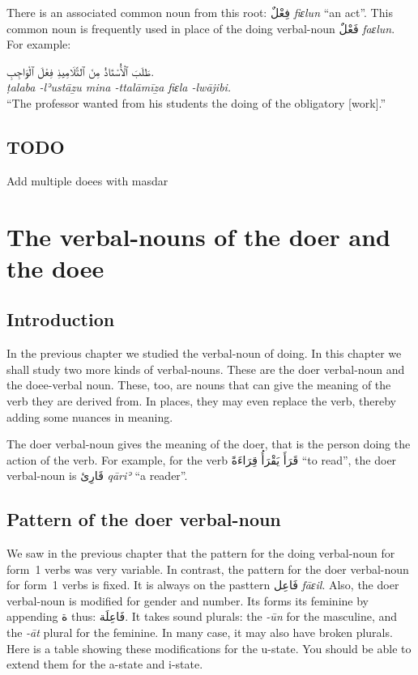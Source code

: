 \documentclass[
  10pt,
]{book}
\begin{document}
There is an associated common noun from this root: \foreignlanguage{arabic}{فِعْلٌ} \emph{fiɛlun} \enquote{an act}. This common noun is frequently used in place of the doing verbal-noun \foreignlanguage{arabic}{فَعْلٌ} \emph{faɛlun}. For example:

\foreignlanguage{arabic}{طَلَبَ ٱلْأُسْتَاذُ مِنَ ٱلتَّلَامِيذِ فِعْلَ ٱلْوَاجِبِ.}\\
\emph{ṭalaba -lʾustāẕu mina -ttalāmīẕa fiɛla -lwājibi.}\\
\enquote{The professor wanted from his students the doing of the obligatory {[}work{]}.}

\section{TODO}\label{todo-1}

Add multiple doees with masdar

\chapter{The verbal-nouns of the doer and the doee}\label{the-verbal-nouns-of-the-doer-and-the-doee}

\section{Introduction}\label{introduction-17}

In the previous chapter we studied the verbal-noun of doing. In this chapter we shall study two more kinds of verbal-nouns. These are the doer verbal-noun and the doee-verbal noun. These, too, are nouns that can give the meaning of the verb they are derived from. In places, they may even replace the verb, thereby adding some nuances in meaning.

The doer verbal-noun gives the meaning of the doer, that is the person doing the action of the verb. For example, for the verb \foreignlanguage{arabic}{قَرَأَ يَقْرَأُ قِرَاءَةً} \enquote{to read}, the doer verbal-noun is \foreignlanguage{arabic}{قَارِئ} \emph{qāriʾ} \enquote{a reader}.

\section{Pattern of the doer verbal-noun}\label{pattern-of-the-doer-verbal-noun}

We saw in the previous chapter that the pattern for the doing verbal-noun for form~1 verbs was very variable. In contrast, the pattern for the doer verbal-noun for form~1 verbs is fixed. It is always on the pasttern \foreignlanguage{arabic}{فَاعِل} \emph{fāɛil}. Also, the doer verbal-noun is modified for gender and number. Its forms its feminine by appending \foreignlanguage{arabic}{ة} thus: \foreignlanguage{arabic}{فَاعِلَة}. It takes sound plurals: the \emph{-ūn} for the masculine, and the \emph{-āt} plural for the feminine. In many case, it may also have broken plurals. Here is a table showing these modifications for the u-state. You should be able to extend them for the a-state and i-state.
\end{document}
